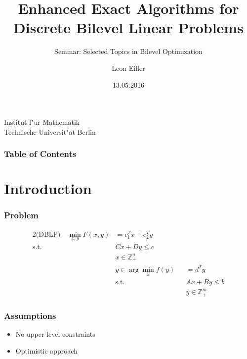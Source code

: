 \documentclass[11pt]{beamer}
\begin{document}
	\title %
	{Enhanced Exact Algorithms for Discrete Bilevel Linear Problems	}
	\subtitle{Seminar: Selected Topics in Bilevel Optimization}
	
	\author %
	{Leon Eifler}
	
	\institute %
	{
	
		Institut f"ur Mathematik\\
		Technische Universit"at Berlin
		
	}
	
	\date %
	{13.05.2016}
	

	\begin{frame}[plain]
	\titlepage

	\end{frame}
	

\begin{frame}
	\frametitle{Table of Contents}
	\tableofcontents
\end{frame}

\section{Introduction}

\begin{frame}	
	\frametitle{Problem}
	\begin{alignat*}{2}
		\text{(DBLP)} \quad \min_{x,y} F(x,y) &= c_1^Tx +c_2^Ty \\
		\text{s.t.} \quad &Cx + Dy \le e \\
		&x \in \mathbb{Z}^n_+ \\
		&y \in \arg \min_y f(y) &&= d^T y \\
		&\text{s.t.} &&Ax+By \le b \\
		& &&y \in \mathbb{Z}^m_+
	\end{alignat*}
\end{frame}

\begin{frame}
	\frametitle{Assumptions}
	\begin{itemize}
		\item No upper level constraints
		\item Optimistic approach
	\end{itemize}
\end{frame}
\end{document}
